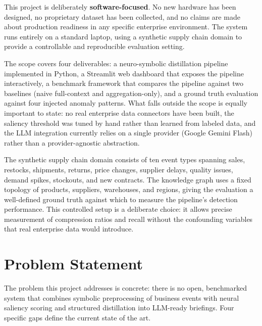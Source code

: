 This project is deliberately \textbf{software-focused}. No new hardware has been designed,
no proprietary dataset has been collected, and no claims are made about production readiness
in any specific enterprise environment. The system runs entirely on a standard laptop, using
a synthetic supply chain domain to provide a controllable and reproducible evaluation setting.

The scope covers four deliverables: a neuro-symbolic distillation pipeline implemented in
Python, a Streamlit web dashboard that exposes the pipeline interactively, a benchmark
framework that compares the pipeline against two baselines (naive full-context and
aggregation-only), and a ground truth evaluation against four injected anomaly patterns.
What falls outside the scope is equally important to state: no real enterprise data
connectors have been built, the saliency threshold was tuned by hand rather than learned
from labeled data, and the LLM integration currently relies on a single provider
(Google Gemini Flash) rather than a provider-agnostic abstraction.

The synthetic supply chain domain consists of ten event types spanning sales, restocks,
shipments, returns, price changes, supplier delays, quality issues, demand spikes, stockouts,
and new contracts. The knowledge graph uses a fixed topology of products, suppliers,
warehouses, and regions, giving the evaluation a well-defined ground truth against which to
measure the pipeline's detection performance. This controlled setup is a deliberate choice:
it allows precise measurement of compression ratios and recall without the confounding
variables that real enterprise data would introduce.

\section{Problem Statement}
\label{sec:problem}

The problem this project addresses is concrete: there is no open, benchmarked system that
combines symbolic preprocessing of business events with neural saliency scoring and
structured distillation into LLM-ready briefings. Four specific gaps define the current
state of the art.

